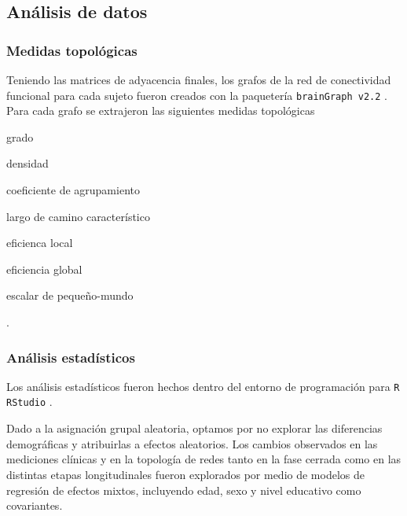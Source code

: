 \subsection{Análisis de datos}
\subsubsection{Medidas topológicas}
Teniendo las matrices de adyacencia finales, los grafos de la red de conectividad funcional para cada sujeto fueron creados con la paquetería \texttt{brainGraph v2.2} \parencite{Watson2018}. Para cada grafo se extrajeron las siguientes medidas topológicas
\begin{enumerate*}[label=\emph{\alph*}), before=\unskip{: }, itemjoin={{; }}, itemjoin*={{, y }}]
    \item grado
    \item densidad
    \item coeficiente de agrupamiento
    \item largo de camino característico
    \item eficienca local
    \item eficiencia global
    \item escalar de pequeño-mundo
\end{enumerate*}.


\subsubsection{Análisis estadísticos}
Los análisis estadísticos fueron hechos dentro del entorno de programación para \texttt{R} \texttt{RStudio} \parencite{Rstudio2018}.\par
Dado a la asignación grupal aleatoria, optamos por no explorar las diferencias demográficas y atribuirlas a efectos aleatorios. Los cambios observados en las mediciones clínicas y en la topología de redes tanto en la fase cerrada como en las distintas etapas longitudinales fueron explorados por medio de modelos de regresión de efectos mixtos, incluyendo edad, sexo y nivel educativo como covariantes.
